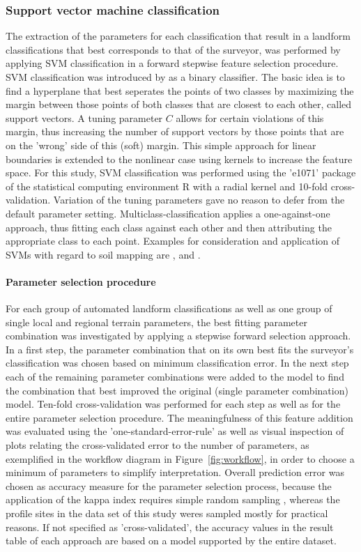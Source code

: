 \documentclass[preprint,12pt,authoryear]{elsarticle}
\begin{document}
\subsubsection{Support vector machine classification}
The extraction of the parameters for each classification that result in a landform classifications that best corresponds to that of the surveyor, was performed by applying SVM classification in a forward stepwise feature selection procedure. SVM classification was introduced by \cite{Cortes1995} as a binary classifier. The basic idea is to find a hyperplane that best seperates the points of two classes by maximizing the margin between those points of both classes that are closest to each other, called support vectors. A tuning parameter $C$ allows for certain violations of this margin, thus increasing the number of support vectors by those points that are on the 'wrong' side of this (soft) margin. This simple approach for linear boundaries is extended to the nonlinear case using kernels to increase the feature space. For this study, SVM classification was performed using the 'e1071' package \citep{meyer2014} of the statistical computing environment R \citep{cran2014} with a radial kernel and 10-fold cross-validation. Variation of the tuning parameters gave  no reason to defer from the default parameter setting. Multiclass-classification applies a one-against-one approach, thus fitting each class against each other and then attributing the appropriate class to each point. Examples for consideration and application of SVMs with regard to soil mapping are \cite{Ballabio2009}, \cite{Behrens2006} and \cite{Rossel2010}.
\paragraph{Parameter selection procedure} For each group of automated landform classifications as well as one group of single local and regional terrain parameters, the best fitting parameter combination was investigated by applying a stepwise forward selection approach. In a first step, the parameter combination that on its own best fits the surveyor's classification was chosen based on minimum classification error. In the next step each of the remaining parameter combinations were added to the model to find the combination that best improved the original (single parameter combination) model. Ten-fold cross-validation was performed for each step as well as for the entire parameter selection procedure. The meaningfulness of this feature addition was evaluated using the 'one-standard-error-rule' \citep{James2013} as well as visual inspection of plots relating the cross-validated error to the number of parameters, as exemplified in the workflow diagram in Figure~\ref{fig:workflow}, in order to choose a minimum of parameters to simplify interpretation. Overall prediction error was chosen as accuracy measure for the parameter selection process, because the application of the kappa index requires simple random sampling \citep{Congalton1991}, whereas the profile sites in the data set of this study weres sampled mostly for practical reasons. If not specified as 'cross-validated', the accuracy values in the result table of each approach are based on a model supported by the entire dataset. 
\end{document}
